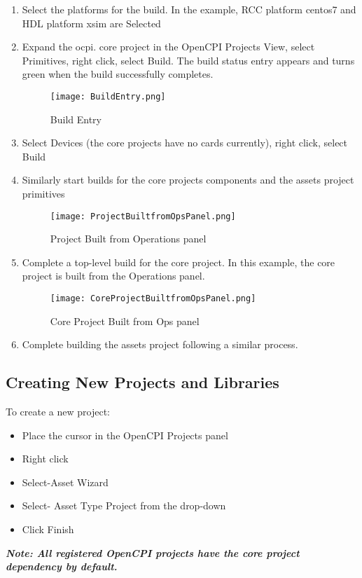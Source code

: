 \documentclass[10pt, a4paper, oneside]{article}
\begin{document}
\begin{enumerate}
\item	Select the platforms for the build. In the example, RCC platform centos7 and HDL platform xsim are Selected
\item	Expand the ocpi. core project in the OpenCPI Projects View, select Primitives, right click, select Build. The build status entry appears and turns green when the build successfully completes.
\begin{figure}[h!]
	\centering
	\caption{Build Entry}\label{fig:Build Entry}
	\texttt{[image: BuildEntry.png]}
 \end{figure}

\item Select Devices (the core projects have no cards currently), right click, select Build
\item Similarly start builds for the core projects components and the assets project primitives
\begin{figure}[h!]
	\centering
	\caption{Project Built from Operations panel}\label{fig:Project Built from Ops panel}
	\texttt{[image: ProjectBuiltfromOpsPanel.png]}
 \end{figure}

\item	Complete a top-level build for the core project. In this example, the core project is built from the Operations panel.
\begin{figure}[h!]
	\centering
	\caption{Core Project Built from Ops panel}\label{fig:Core Project Built from Ops panel}
	\texttt{[image: CoreProjectBuiltfromOpsPanel.png]}
 \end{figure}

\item	Complete building the assets project following a similar process.
\end{enumerate}

\subsection{Creating New Projects and Libraries}
To create a new project:
\begin{itemize}
\item	Place the cursor in the OpenCPI Projects panel
\item	Right click
\item Select-Asset Wizard
\item	Select- Asset Type Project from the drop-down
\item	Click Finish
\end{itemize}
\textbf{\emph{Note: All registered OpenCPI projects have the core project dependency by default.}}\\
\end{document}
